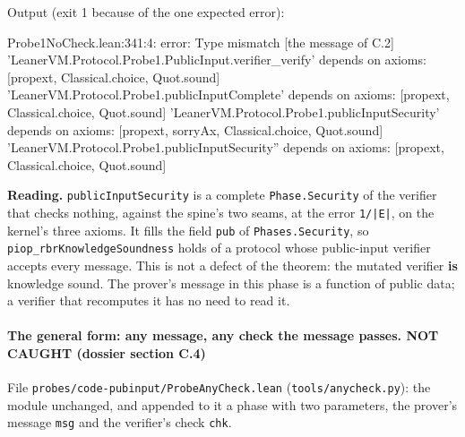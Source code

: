 Output (exit 1 because of the one expected error):

\begin{srccode}
Probe1NoCheck.lean:341:4: error: Type mismatch   [the message of C.2]
'LeanerVM.Protocol.Probe1.PublicInput.verifier_verify' depends on axioms: [propext, Classical.choice, Quot.sound]
'LeanerVM.Protocol.Probe1.publicInputComplete' depends on axioms: [propext, Classical.choice, Quot.sound]
'LeanerVM.Protocol.Probe1.publicInputSecurity' depends on axioms: [propext, sorryAx, Classical.choice, Quot.sound]
'LeanerVM.Protocol.Probe1.publicInputSecurity'' depends on axioms: [propext, Classical.choice, Quot.sound]
\end{srccode}

\textbf{Reading.} \texttt{publicInputSecurity\textquotesingle{}} is a complete \texttt{Phase.\allowbreak{}Security} of the verifier that checks nothing, against the spine's two seams, at the error \texttt{1/\allowbreak{}|E|}, on the kernel's three axioms. It fills the field \texttt{pub} of \texttt{Phases.\allowbreak{}Security}, so \texttt{piop\_\allowbreak{}rbrKnowledgeSoundness} holds of a protocol whose public-input verifier accepts every message. This is not a defect of the theorem: the mutated verifier \textbf{is} knowledge sound. The prover's message in this phase is a function of public data; a verifier that recomputes it has no need to read it.

\paragraph{The general form: any message, any check the message passes. NOT CAUGHT (dossier section C.4)}\label{sec:gen-pubinput-C4}

File \texttt{p\allowbreak{}r\allowbreak{}o\allowbreak{}b\allowbreak{}e\allowbreak{}s\allowbreak{}/\allowbreak{}c\allowbreak{}o\allowbreak{}d\allowbreak{}e\allowbreak{}-{}\allowbreak{}p\allowbreak{}u\allowbreak{}b\allowbreak{}i\allowbreak{}n\allowbreak{}p\allowbreak{}u\allowbreak{}t\allowbreak{}/\allowbreak{}P\allowbreak{}r\allowbreak{}o\allowbreak{}b\allowbreak{}e\allowbreak{}A\allowbreak{}n\allowbreak{}y\allowbreak{}C\allowbreak{}h\allowbreak{}e\allowbreak{}c\allowbreak{}k\allowbreak{}.\allowbreak{}l\allowbreak{}e\allowbreak{}a\allowbreak{}n} (\texttt{tools/\allowbreak{}anycheck.\allowbreak{}py}): the module unchanged, and appended to it a phase with two parameters, the prover's message \texttt{msg} and the verifier's check \texttt{chk}.

